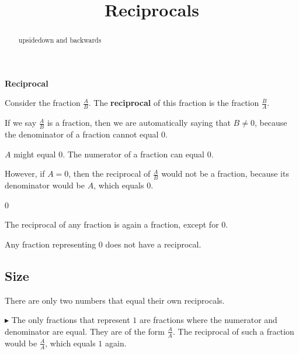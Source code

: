 \documentclass{ximera}
\title{Reciprocals}
\begin{document}
\begin{abstract}
upsidedown and backwards
\end{abstract}
\maketitle







\begin{definition}  \textbf{\textcolor{green!50!black}{Reciprocal}}


Consider the fraction $\frac{A}{B}$.  The \textbf{reciprocal} of this fraction is the fraction $\frac{B}{A}$.


\end{definition}



If we say $\frac{A}{B}$ is a fraction, then we are automatically saying that $B \ne 0$, because the denominator of a fraction cannot equal $0$. 

$A$ might equal $0$.  The numerator of a fraction can equal $0$. 


However, if $A= 0$, then the reciprocal of $\frac{A}{B}$ would not be a fraction, because its denominator would be $A$, which equals $0$.



\begin{warning} \textbf{\textcolor{red!70!black}{$0$}}

The reciprocal of any fraction is again a fraction, except for $0$. 

Any fraction representing $0$ does not have a reciprocal.


\end{warning}



\subsection*{Size}



There are only two numbers that equal their own reciprocals.



$\blacktriangleright$ The only fractions that represent $1$ are fractions where the numerator and denominator are equal.  They are of the form $\frac{A}{A}$.  The reciprocal of such a fraction would be $\frac{A}{A}$, which equals $1$ again.
\end{document}
